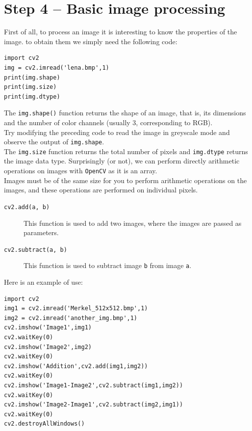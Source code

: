 \documentclass{labo}
\newcommand{\opencv}{\texttt{OpenCV} }
\begin{document}
\section*{Step 4 -- Basic image processing}
First of all, to process an image it is interesting to know the properties of the image. to obtain them we simply need the following code:

\begin{verbatim}
import cv2
img = cv2.imread('lena.bmp',1)
print(img.shape)
print(img.size)
print(img.dtype)
\end{verbatim}

The \texttt{img.shape()} function returns the shape of an image, that is, its dimensions and the number of color channels (usually 3, corresponding to RGB).\\

Try modifying the preceding code to read the image in greyscale mode and observe the output of \texttt{img.shape}.\\

The \texttt{img.size} function returns the total number of pixels and \texttt{img.dtype} returns the image data type.
Surprisingly (or not), we can perform directly arithmetic operations on images with \opencv as it is an array.\\

Images must be of the same size for you to perform arithmetic operations on the images, and these operations are performed on individual pixels.

\begin{description}
	\item[\texttt{cv2.add(a, b)}] This function is used to add two images, where the images are passed as parameters.
	\item[\texttt{cv2.subtract(a, b)}] This function is used to subtract image \texttt{b} from image \texttt{a}.
\end{description}

Here is an example of use:
\begin{verbatim}
import cv2
img1 = cv2.imread('Merkel_512x512.bmp',1)
img2 = cv2.imread('another_img.bmp',1)
cv2.imshow('Image1',img1)
cv2.waitKey(0)
cv2.imshow('Image2',img2)
cv2.waitKey(0)
cv2.imshow('Addition',cv2.add(img1,img2))
cv2.waitKey(0)
cv2.imshow('Image1-Image2',cv2.subtract(img1,img2))
cv2.waitKey(0)
cv2.imshow('Image2-Image1',cv2.subtract(img2,img1))
cv2.waitKey(0)
cv2.destroyAllWindows()
\end{verbatim}
\end{document}
